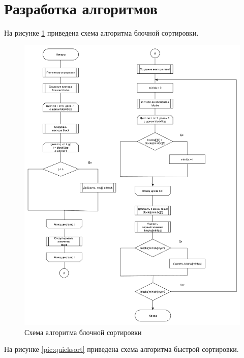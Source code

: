 \section{Разработка алгоритмов}

На рисунке \ref{pic:blocksort} приведена схема алгоритма блочной сортировки.

\begin{figure}[H]
	\centering
	\includegraphics[scale=0.5]{assets/blocksort.pdf}
	\caption{Схема алгоритма блочной сортировки}
	\label{pic:blocksort}
\end{figure}

\newpage

На рисунке \ref{pic:quicksort} приведена схема алгоритма быстрой сортировки.


